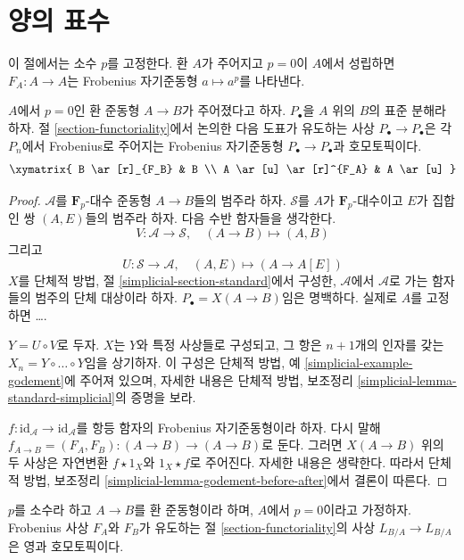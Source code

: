 \section{양의 표수}
\label{section-positive-characteristic}

\noindent
이 절에서는 소수 $p$를 고정한다. 환 $A$가 주어지고 $p=0$이 $A$에서 성립하면
$F_A:A\to A$는 Frobenius 자기준동형 $a\mapsto a^p$를 나타낸다.

\begin{lemma}
\label{lemma-frobenius-homotopy}
$A$에서 $p=0$인 환 준동형 $A\to B$가 주어졌다고 하자.
$P_\bullet$을 $A$ 위의 $B$의 표준 분해라 하자. 절
\ref{section-functoriality}에서 논의한 다음 도표가 유도하는 사상
$P_\bullet\to P_\bullet$은 각 $P_n$에서 Frobenius로 주어지는 Frobenius
자기준동형 $P_\bullet\to P_\bullet$과 호모토픽이다.
$$
\xymatrix{
B \ar[r]_{F_B} & B \\
A \ar[u] \ar[r]^{F_A} & A \ar[u]
}
$$
\end{lemma}

\begin{proof}
$\mathcal{A}$를 $\mathbf{F}_p$-대수 준동형 $A\to B$들의 범주라 하자.
$\mathcal{S}$를 $A$가 $\mathbf{F}_p$-대수이고 $E$가 집합인 쌍
$(A,E)$들의 범주라 하자. 다음 수반 함자들을 생각한다.
$$
V : \mathcal{A} \to \mathcal{S}, \quad (A \to B) \mapsto (A, B)
$$
그리고
$$
U : \mathcal{S} \to \mathcal{A}, \quad (A, E) \mapsto (A \to A[E])
$$
$X$를 단체적 방법, 절 \ref{simplicial-section-standard}에서 구성한,
$\mathcal{A}$에서 $\mathcal{A}$로 가는 함자들의 범주의 단체 대상이라
하자. $P_\bullet=X(A\to B)$임은 명백하다. 실제로 $A$를 고정하면 \ldots.

\medskip\noindent
$Y=U\circ V$로 두자. $X$는 $Y$와 특정 사상들로 구성되고, 그 항은
$n+1$개의 인자를 갖는 $X_n=Y\circ\ldots\circ Y$임을 상기하자. 이
구성은 단체적 방법, 예 \ref{simplicial-example-godement}에 주어져 있으며,
자세한 내용은 단체적 방법, 보조정리
\ref{simplicial-lemma-standard-simplicial}의 증명을 보라.

\medskip\noindent
$f:\text{id}_\mathcal{A}\to\text{id}_\mathcal{A}$를 항등 함자의 Frobenius
자기준동형이라 하자. 다시 말해
$f_{A\to B}=(F_A,F_B):(A\to B)\to(A\to B)$로 둔다. 그러면
$X(A\to B)$ 위의 두 사상은 자연변환 $f\star1_X$와 $1_X\star f$로
주어진다. 자세한 내용은 생략한다. 따라서 단체적 방법, 보조정리
\ref{simplicial-lemma-godement-before-after}에서 결론이 따른다.
\end{proof}

\begin{lemma}
\label{lemma-frobenius-acts-as-zero}
$p$를 소수라 하고 $A\to B$를 환 준동형이라 하며, $A$에서 $p=0$이라고
가정하자. Frobenius 사상 $F_A$와 $F_B$가 유도하는 절
\ref{section-functoriality}의 사상 $L_{B/A}\to L_{B/A}$은 영과
호모토픽이다.
\end{lemma}

